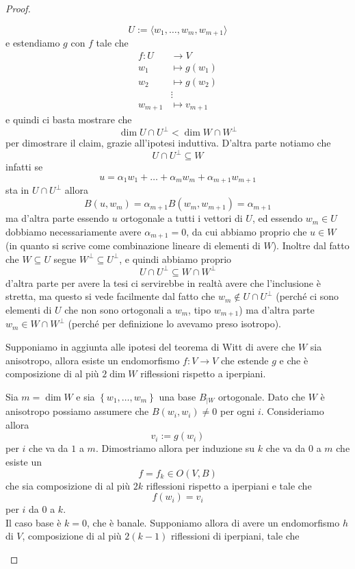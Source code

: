 \documentclass[11pt]{scrartcl}
\begin{document}
\begin{proof}
\begin{subproof}[Sottodimostrazione]
			$$U:=\langle w_1,\dots,w_m,w_{m+1}\rangle$$
			e estendiamo $g$ con $f$ tale che
			\begin{align*}
				f: U & \to V \\
				w_{1} & \mapsto g(w_1) \\
				w_{2} & \mapsto g(w_2) \\
				& \vdots \\
				w_{m+1} & \mapsto v_{m+1}
			\end{align*}
			e quindi ci basta mostrare che 
			$$\dim U \cap U^\perp < \dim W \cap W^\perp $$
			per dimostrare il claim, grazie all'ipotesi induttiva. D'altra parte notiamo che 
			$$U\cap U^\perp \subseteq W$$
			infatti se 
			$$u=\alpha_1w_1+\dots+\alpha_mw_m+\alpha_{m+1}w_{m+1}$$
			sta in $U\cap U^\perp$ allora 
			$$B(u,w_m)=\alpha_{m+1}B(w_m,w_{m+1})=\alpha_{m+1}$$
			ma d'altra parte essendo $u$ ortogonale a tutti i vettori di $U$, ed essendo $w_m\in U$ dobbiamo necessariamente avere $\alpha_{m+1}=0$, da cui abbiamo proprio che $u\in W$ (in quanto si scrive come combinazione lineare di elementi di $W$). Inoltre dal fatto che $W\subseteq U$ segue $W^\perp \subseteq U^\perp$, e quindi abbiamo proprio 
			$$U\cap U^\perp \subseteq W\cap W^\perp$$
			d'altra parte per avere la tesi ci servirebbe in realtà avere che l'inclusione è stretta, ma questo si vede facilmente dal fatto che $w_{m}\not\in U\cap U^\perp $ (perché ci sono elementi di $U$ che non sono ortogonali a $w_m$, tipo $w_{m+1}$) ma d'altra parte $w_{m}\in W\cap W^\perp$ (perché per definizione lo avevamo preso isotropo).
		\end{subproof}
		\begin{claim}
			Supponiamo in aggiunta alle ipotesi del teorema di Witt di avere che $W$ sia anisotropo, allora esiste un endomorfismo $f:V\to V$ che estende $g$ e che è composizione di al più $2\dim W$ riflessioni rispetto a iperpiani.
		\end{claim}
		\begin{subproof}
			Sia $m=\dim W$ e sia $\left\{w_1,\dots,w_m\right\}$ una base $B_{\mid W}$ ortogonale. Dato che $W$ è anisotropo possiamo assumere che $B(w_i,w_i)\ne 0$ per ogni $i$. Consideriamo allora 
			$$v_i:=g(w_i)$$
			per $i$ che va da $1$ a $m$. Dimostriamo allora per induzione su $k$ che va da $0$ a $m$ che esiste un 
			$$f=f_k\in O(V,B)$$
			che sia composizione di al più $2k$ riflessioni rispetto a iperpiani e tale che $$f(w_i)=v_i$$
			per $i$ da $0$ a $k$.\\
			Il caso base è $k=0$, che è banale. Supponiamo allora di avere un endomorfismo $h$ di $V$, composizione di al più $2(k-1)$ riflessioni di iperpiani, tale che

\end{subproof}
\end{proof}
\end{document}
